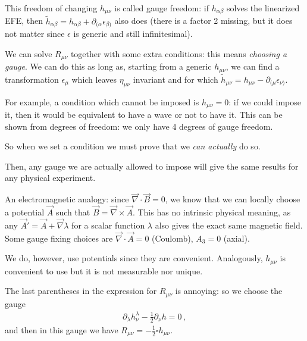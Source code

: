 \documentclass[main.tex]{subfiles}
\begin{document}
This freedom of changing \(h_{\mu \nu }\) is called gauge freedom: if \(h_{\alpha \beta }\) solves the linearized EFE, then \(\widetilde{h}_{\alpha \beta } = h_{\alpha \beta } + \partial_{(\alpha } \epsilon_{\beta )}\) also does (there is a factor 2 missing, but it does not matter since \(\epsilon \) is generic and still infinitesimal). 

We can solve \(R_{\mu \nu } \) together with some extra conditions: this means \emph{choosing a gauge}. 
We can do this as long as, starting from a generic \(h_{\mu \nu }\), we can find a transformation \(\epsilon_{\mu }\) which leaves \(\eta_{\mu \nu } \) invariant and for which \(\widetilde{h}_{\mu \nu } = h_{\mu \nu } - \partial_{(\mu } \epsilon_{\nu )}\). 

For example, a condition which cannot be imposed is \(h_{\mu \nu } =0\): if we could impose it, then it would be equivalent to have a wave or not to have it. 
This can be shown from degrees of freedom: we only have 4 degrees of gauge freedom. 

So when we set a condition we must prove that we \emph{can actually} do so. 

Then, any gauge we are actually allowed to impose will give the same results for any physical experiment. 

An electromagnetic analogy: since \(\vec{\nabla} \cdot \vec{B} = 0\), we know that we can locally choose a potential \(\vec{A} \) such that \(\vec{B} = \vec{\nabla} \times \vec{A}\). This has no intrinsic physical meaning, as any \(\vec{A}' = \vec{A} + \vec{\nabla} \lambda \) for a scalar function \(\lambda \) also gives the exact same magnetic field. 
Some gauge fixing choices are \(\vec{\nabla} \cdot \vec{A} = 0\) (Coulomb), \(A_{3} = 0\) (axial). 

We do, however, use potentials since they are convenient. 
Analogously, \(h_{\mu \nu }\) is convenient to use but it is not measurable nor unique. 


The last parentheses in the expression for \(R_{\mu \nu } \) is annoying: so we choose the gauge 
%
\begin{align}
\partial_{\lambda } h^{\lambda  }_{\nu } - \frac{1}{2} \partial_{\nu } h = 0
\,,
\end{align}
%
and then in this gauge we have \(R_{\mu \nu } = - \frac{1}{2}  \square h_{\mu \nu }\). 
\end{document}
